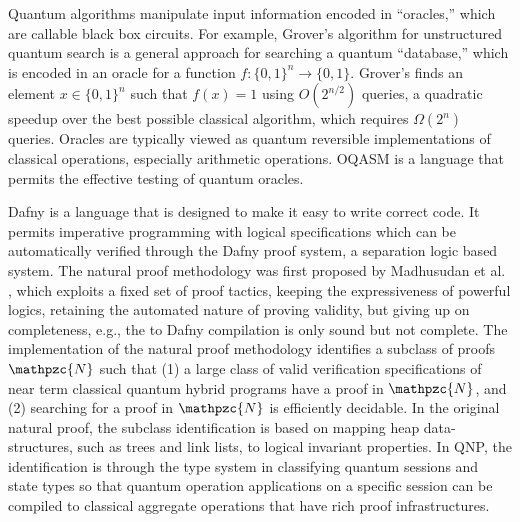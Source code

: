 Quantum algorithms manipulate input information encoded in ``oracles,'' which are callable black box circuits. For example, Grover's algorithm for unstructured quantum search \cite{grover1996,grover1997} is a general approach for searching a quantum ``database,'' which is encoded in an oracle for a function $f : \{0, 1\}^n \to \{0, 1\}$. Grover's finds an element $x \in \{0, 1\}^n$ such that $f(x) = 1$ using $O(2^{n/2})$ queries, a quadratic speedup over the best possible classical algorithm, which requires $\Omega(2^n)$ queries. Oracles are typically viewed as quantum reversible implementations of classical operations, especially arithmetic operations. OQASM \cite{oracleoopsla} is a language that permits the effective testing of quantum oracles.

 Dafny \cite{10.1007/978-3-642-17511-4_20} is a language that is designed to make it easy to write correct code. It permits imperative programming with logical specifications which can be automatically verified through the Dafny proof system, a separation logic based system. The natural proof methodology was first proposed by Madhusudan \textsf{et al.} \cite{nat-proof,10.1145/2103621.2103673}, which exploits a fixed set of proof tactics, keeping the expressiveness of powerful logics, retaining the
automated nature of proving validity, but giving up on completeness, e.g., the \qafny to Dafny compilation is only sound but not complete. 
The \qafny implementation of the natural proof methodology identifies a subclass of proofs $\mathpzc{N}$ such that
(1) a large class of valid verification specifications of near term classical quantum hybrid programs have a proof in $\mathpzc{N}$, 
and (2) searching for a proof in $\mathpzc{N}$ is efficiently decidable. 
In the original natural proof, the subclass identification is based on mapping heap data-structures, such as trees and link lists, to logical invariant properties. In QNP, the identification is through the \qafny type system in classifying quantum sessions and state types so that quantum operation applications on a specific session can be compiled to classical aggregate operations that have rich proof infrastructures. 










